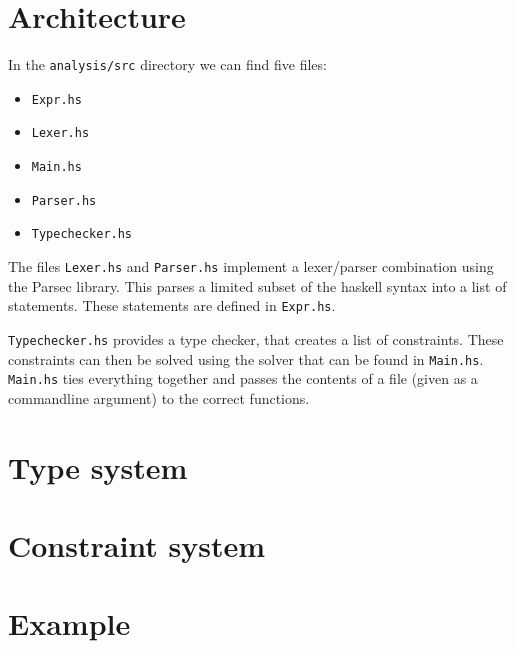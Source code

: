 \documentclass[10pt]{article}
\title{}
\author{Frank Dedden \and Wilco Kusee}
\begin{document}
\maketitle

\section{Architecture}
In the \texttt{analysis/src} directory we can find five files:
\begin{itemize}
	\item \texttt{Expr.hs}
	\item \texttt{Lexer.hs}
	\item \texttt{Main.hs}
	\item \texttt{Parser.hs}
	\item \texttt{Typechecker.hs}
\end{itemize}
The files \texttt{Lexer.hs} and \texttt{Parser.hs} implement a lexer/parser combination using the Parsec library. This parses a limited subset of the haskell syntax into a list of statements. These statements are defined in \texttt{Expr.hs}.

\texttt{Typechecker.hs} provides a type checker, that creates a list of constraints. These constraints can then be solved using the solver that can be found in \texttt{Main.hs}. \texttt{Main.hs} ties everything together and passes the contents of a file (given as a commandline argument) to the correct functions.


\section{Type system}


\section{Constraint system}


\section{Example}
\end{document}
